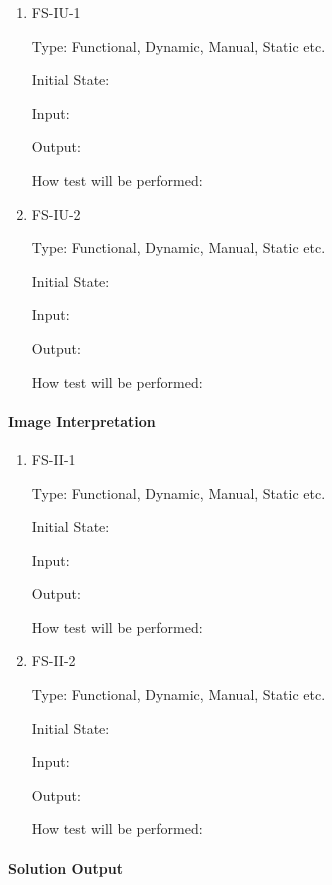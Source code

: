 \documentclass[11pt]{article}
\begin{document}
\begin{enumerate}

\item{FS-IU-1\\}

Type: Functional, Dynamic, Manual, Static etc.
					
Initial State: 
					
Input: 
					
Output: 
					
How test will be performed: 
					
\item{FS-IU-2\\}

Type: Functional, Dynamic, Manual, Static etc.
					
Initial State: 
					
Input: 
					
Output: 
					
How test will be performed: 

\end{enumerate}

\paragraph{Image Interpretation}

\begin{enumerate}

\item{FS-II-1\\}

Type: Functional, Dynamic, Manual, Static etc.
					
Initial State: 
					
Input: 
					
Output: 
					
How test will be performed: 
					
\item{FS-II-2\\}

Type: Functional, Dynamic, Manual, Static etc.
					
Initial State: 
					
Input: 
					
Output: 
					
How test will be performed: 

\end{enumerate}

\paragraph{Solution Output}
\end{document}
